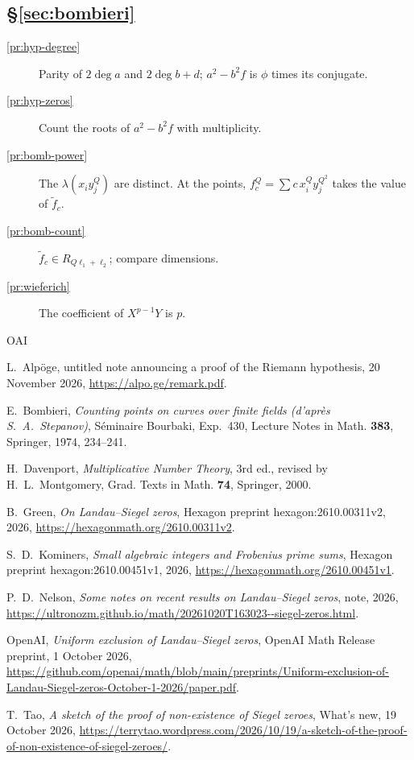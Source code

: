 \documentclass[reqno]{amsart}
\theoremstyle{definition}
\theoremstyle{plain}
\begin{document}
\subsection*{\S\ref{sec:bombieri}}
\begin{description}
\item[\ref{pr:hyp-degree}] Parity of \(2\deg a\) and \(2\deg b + d\); \(a^2 - b^2 f\) is \(\phi\) times its conjugate.
\item[\ref{pr:hyp-zeros}] Count the roots of \(a^2 - b^2 f\) with multiplicity.
\item[\ref{pr:bomb-power}] The \(\lambda(x_i y_j^Q)\) are distinct.  At the points, \(f_c^Q = \sum c\, x_i^Q y_j^{Q^2}\) takes the value of \(\tilde f_c\).
\item[\ref{pr:bomb-count}] \(\tilde f_c \in R_{Q\ell_1 + \ell_2}\); compare dimensions.
\item[\ref{pr:wieferich}] The coefficient of \(X^{p-1}Y\) is \(p\).
\end{description}

\begin{thebibliography}{OAI}

L.~Alp\"oge, untitled note announcing a proof of the Riemann hypothesis, 20 November 2026, \url{https://alpo.ge/remark.pdf}.

E.~Bombieri, \emph{Counting points on curves over finite fields (d'apr\`es S.~A.~Stepanov)}, S\'eminaire Bourbaki, Exp.~430, Lecture Notes in Math. \textbf{383}, Springer, 1974, 234--241.

H.~Davenport, \emph{Multiplicative Number Theory}, 3rd ed., revised by H.~L.~Montgomery, Grad. Texts in Math. \textbf{74}, Springer, 2000.

B.~Green, \emph{On Landau--Siegel zeros}, Hexagon preprint hexagon:2610.00311v2, 2026, \url{https://hexagonmath.org/2610.00311v2}.

S.~D.~Kominers, \emph{Small algebraic integers and Frobenius prime sums}, Hexagon preprint hexagon:2610.00451v1, 2026, \url{https://hexagonmath.org/2610.00451v1}.

P.~D.~Nelson, \emph{Some notes on recent results on Landau--Siegel zeros}, note, 2026, \url{https://ultronozm.github.io/math/20261020T163023--siegel-zeros.html}.

OpenAI, \emph{Uniform exclusion of Landau--Siegel zeros}, OpenAI Math Release preprint, 1 October 2026, \url{https://github.com/openai/math/blob/main/preprints/Uniform-exclusion-of-Landau-Siegel-zeros-October-1-2026/paper.pdf}.

T.~Tao, \emph{A sketch of the proof of non-existence of Siegel zeroes}, What's new, 19 October 2026, \url{https://terrytao.wordpress.com/2026/10/19/a-sketch-of-the-proof-of-non-existence-of-siegel-zeroes/}.

\end{thebibliography}
\end{document}

